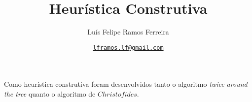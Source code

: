 \documentclass{article}
\title{Heurística Construtiva}
\author{Luís Felipe Ramos Ferreira}
\date{\href{mailto:lframos.lf@gmail.com}{\texttt{lframos.lf@gmail.com}}
}
\begin{document}
\maketitle

Como heurística construtiva foram desenvolvidos tanto o algoritmo \textit{twice around the tree} quanto o algoritmo de \(Christofides\).
\end{document}
